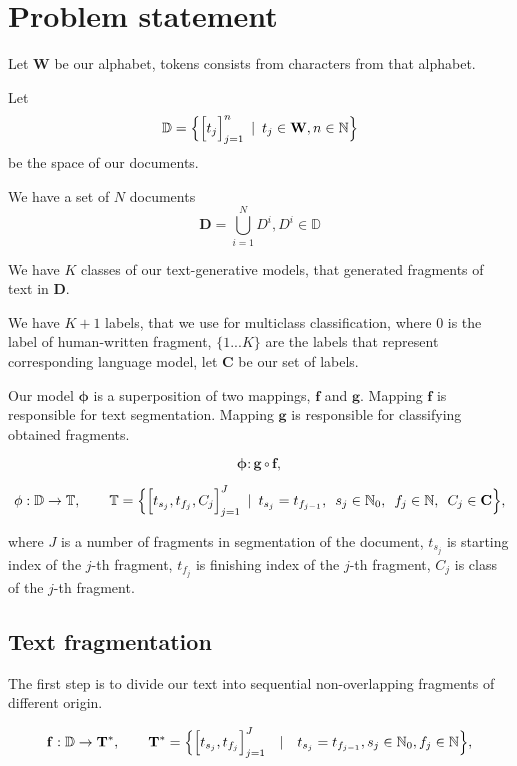 \documentclass{article}
\newcommand{\Hquad}{\hspace{0.5em}}
\begin{document}
\section{Problem statement}

Let $\mathbf{W}$ be our alphabet, tokens consists from characters from that alphabet.

Let $$\mathbb{D} = \Bigl\{\Big[t_j\Big]_{j=1}^n \Hquad|\Hquad t_j \in \mathbf{W}, n \in \mathbb{N}\Bigr\}$$ be the space of our documents.

We have a set of $N$ documents
$$\mathbf{D} = \bigcup_{i=1}^{N}D^i, D^i \in \mathbb{D}$$

We have $K$ classes of our text-generative models, that generated fragments of text in $\mathbf{D}$.

We have $K + 1$ labels, that we use for multiclass classification, where $0$ is the label of human-written fragment, $\{1...K\}$ are the  labels that represent corresponding language model, let $\mathbf{C}$ be our set of labels.

Our model $\mathbf{\phi}$ is a superposition of two mappings, $\mathbf{f}$ and $\mathbf{g}$. Mapping $\mathbf{f}$ is responsible for text segmentation. Mapping $\mathbf{g}$ is responsible for classifying obtained fragments.

$$\mathbf{\phi} : \mathbf{g} \circ \mathbf{f},$$


$$\mathbf{\phi}: \mathbb{D} \rightarrow \mathbb{T}, \qquad \mathbb{T} = \Bigl\{\Big[t_{s_j}, t_{f_j}, C_j\Big]_{j = 1}^{J} \Hquad|\Hquad t_{s_j} = t_{f_{j - 1}},\Hquad s_j \in \mathbb{N}_0,\Hquad f_j \in \mathbb{N}, \Hquad C_j \in \mathbf{C}\Bigr\},$$

where $J$ is a number of fragments in segmentation of the document, $t_{s_j}$ is starting index of the $j$-th fragment,  $t_{f_j}$ is finishing index of the $j$-th fragment,  $C_{j}$ is class of the $j$-th fragment.



\subsection{Text fragmentation}
The first step is to divide our text into sequential non-overlapping fragments of different origin.

$$\mathbf{f}: \mathbb{D} \rightarrow \mathbf{T}^*, \qquad \mathbf{T}^* = \Bigl\{\Big[t_{s_j}, t_{f_j}\Big]_{j = 1}^{J}\quad|\quad t_{s_j} = t_{f_{j - 1}}, s_j \in \mathbb{N}_0, f_j \in \mathbb{N}\Bigr\},$$
\end{document}
